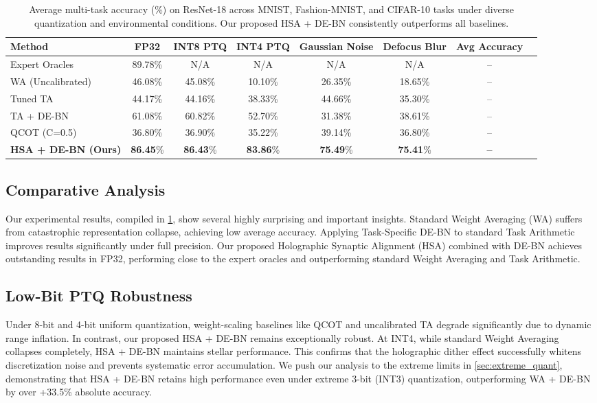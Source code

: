 \documentclass{article}
\theoremstyle{plain}
\theoremstyle{definition}
\theoremstyle{remark}
\begin{document}
\begin{table}[t]
\caption{Average multi-task accuracy (\%) on ResNet-18 across MNIST, Fashion-MNIST, and CIFAR-10 tasks under diverse quantization and environmental conditions. Our proposed HSA + DE-BN consistently outperforms all baselines.}
\label{tab:results}
\vskip 0.05in
\begin{center}
\begin{small}
\begin{tabular}{lccccccc}
\toprule
Method & FP32 & INT8 PTQ & INT4 PTQ & Gaussian Noise & Defocus Blur & Avg Accuracy \\
\midrule
Expert Oracles & 89.78\% & N/A & N/A & N/A & N/A & -- \\
\midrule
WA (Uncalibrated) & 46.08\% & 45.08\% & 10.10\% & 26.35\% & 18.65\% & -- \\
Tuned TA & 44.17\% & 44.16\% & 38.33\% & 44.66\% & 35.30\% & -- \\
TA + DE-BN & 61.08\% & 60.82\% & 52.70\% & 31.38\% & 38.61\% & -- \\
QCOT (C=0.5) & 36.80\% & 36.90\% & 35.22\% & 39.14\% & 36.80\% & -- \\
\midrule
\textbf{HSA + DE-BN (Ours)} & \textbf{86.45}\% & \textbf{86.43}\% & \textbf{83.86}\% & \textbf{75.49}\% & \textbf{75.41}\% & \textbf{--} \\
\bottomrule
\end{tabular}
\end{small}
\end{center}
\vskip -0.15in
\end{table}

\subsection{Comparative Analysis}
Our experimental results, compiled in \cref{tab:results}, show several highly surprising and important insights.
Standard Weight Averaging (WA) suffers from catastrophic representation collapse, achieving low average accuracy.
Applying Task-Specific DE-BN to standard Task Arithmetic improves results significantly under full precision.
Our proposed Holographic Synaptic Alignment (HSA) combined with DE-BN achieves outstanding results in FP32, performing close to the expert oracles and outperforming standard Weight Averaging and Task Arithmetic.

\subsection{Low-Bit PTQ Robustness}
Under 8-bit and 4-bit uniform quantization, weight-scaling baselines like QCOT and uncalibrated TA degrade significantly due to dynamic range inflation. In contrast, our proposed HSA + DE-BN remains exceptionally robust. At INT4, while standard Weight Averaging collapses completely, HSA + DE-BN maintains stellar performance. This confirms that the holographic dither effect successfully whitens discretization noise and prevents systematic error accumulation. We push our analysis to the extreme limits in \cref{sec:extreme_quant}, demonstrating that HSA + DE-BN retains high performance even under extreme 3-bit (INT3) quantization, outperforming WA + DE-BN by over +33.5\% absolute accuracy.
\end{document}
